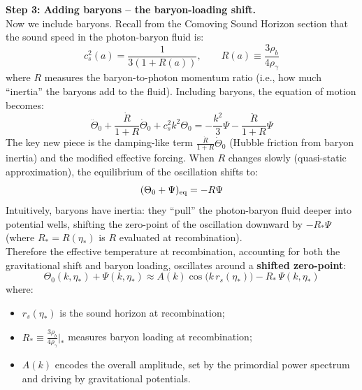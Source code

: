 \begin{foundation}
    \textbf{Step 3: Adding baryons -- the baryon-loading shift.} \\
    Now we include baryons. Recall from the Comoving Sound Horizon section that the sound speed in the photon-baryon fluid is:
    \[
        c_s^2(a) = \frac{1}{3(1 + R(a))}, \qquad R(a) \equiv \frac{3\rho_b}{4\rho_\gamma}
    \]
    where $R$ measures the baryon-to-photon momentum ratio (i.e., how much ``inertia'' the baryons add to the fluid). Including baryons, the equation of motion becomes:
    \[
        \ddot{\Theta}_0 + \frac{\dot{R}}{1+R}\dot{\Theta}_0 + c_s^2 k^2 \Theta_0 = -\frac{k^2}{3}\Psi - \frac{\ddot{R}}{1+R}\Psi
    \]
    The key new piece is the damping-like term $\frac{\dot{R}}{1+R}\dot{\Theta}_0$ (Hubble friction from baryon inertia) and the modified effective forcing. When $R$ changes slowly (quasi-static approximation), the equilibrium of the oscillation shifts to:
    \[
        (\Theta_0 + \Psi)_{\rm eq} = -R \Psi
    \]
    Intuitively, baryons have inertia: they ``pull'' the photon-baryon fluid deeper into potential wells, shifting the zero-point of the oscillation downward by $-R_*\Psi$ (where $R_* = R(\eta_*)$ is $R$ evaluated at recombination). \\

    Therefore the effective temperature at recombination, accounting for both the gravitational shift and baryon loading, oscillates around a \textbf{shifted zero-point}:
    \[
        \Theta_0(k,\eta_*) + \Psi(k,\eta_*)
        \approx A(k)\cos\!\big(k\,r_s(\eta_*)\big) - R_*\,\Psi(k,\eta_*)
    \]
    where:
    \begin{itemize}
        \item $r_s(\eta_*)$ is the sound horizon at recombination;
        \item $R_* \equiv \frac{3\rho_b}{4\rho_\gamma}\big|_* $ measures baryon loading at recombination;
        \item $A(k)$ encodes the overall amplitude, set by the primordial power spectrum and driving by gravitational potentials.
    \end{itemize} \\


\end{foundation}
